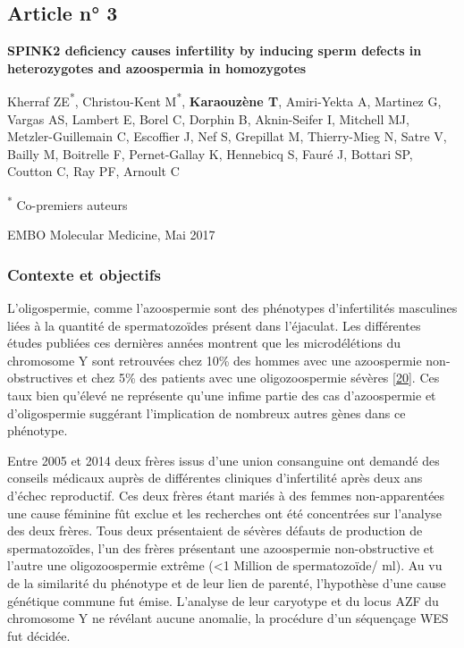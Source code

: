 \documentclass[12pt,twoside]{ugathesis}
\begin{document}
\newpage

\newpage  

\subsection{Article n° 3}\label{article-n-3}

\textbf{SPINK2 deficiency causes infertility by inducing sperm defects
in heterozygotes and azoospermia in homozygotes}

Kherraf ZE\textsuperscript{*}, Christou-Kent M\textsuperscript{*},
\textbf{Karaouzène T}, Amiri-Yekta A, Martinez G, Vargas AS, Lambert E,
Borel C, Dorphin B, Aknin-Seifer I, Mitchell MJ, Metzler-Guillemain C,
Escoffier J, Nef S, Grepillat M, Thierry-Mieg N, Satre V, Bailly M,
Boitrelle F, Pernet-Gallay K, Hennebicq S, Fauré J, Bottari SP, Coutton
C, Ray PF, Arnoult C

\textsuperscript{*} Co-premiers auteurs

EMBO Molecular Medicine, Mai 2017

\newpage

\subsubsection{Contexte et objectifs}\label{contexte-et-objectifs}

L'oligospermie, comme l'azoospermie sont des phénotypes d'infertilités
masculines liées à la quantité de spermatozoïdes présent dans
l'éjaculat. Les différentes études publiées ces dernières années
montrent que les microdélétions du chromosome Y sont retrouvées chez
10\% des hommes avec une azoospermie non-obstructives et chez 5\% des
patients avec une oligozoospermie sévères
{[}\protect\hyperlink{ref-Hotaling2014}{20}{]}. Ces taux bien qu'élevé
ne représente qu'une infime partie des cas d'azoospermie et
d'oligospermie suggérant l'implication de nombreux autres gènes dans ce
phénotype.

Entre 2005 et 2014 deux frères issus d'une union consanguine ont demandé
des conseils médicaux auprès de différentes cliniques d'infertilité
après deux ans d'échec reproductif. Ces deux frères étant mariés à des
femmes non-apparentées une cause féminine fût exclue et les recherches
ont été concentrées sur l'analyse des deux frères. Tous deux
présentaient de sévères défauts de production de spermatozoïdes, l'un
des frères présentant une azoospermie non-obstructive et l'autre une
oligozoospermie extrême (\textless{}1 Million de spermatozoïde/ ml). Au
vu de la similarité du phénotype et de leur lien de parenté, l'hypothèse
d'une cause génétique commune fut émise. L'analyse de leur caryotype et
du locus AZF du chromosome Y ne révélant aucune anomalie, la procédure
d'un séquençage WES fut décidée.
\end{document}
